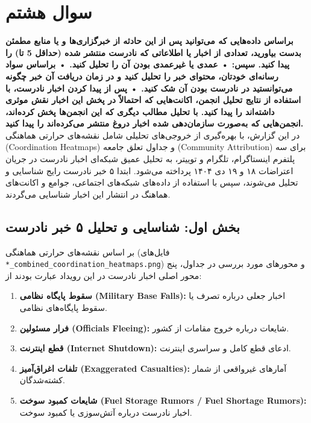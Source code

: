 \documentclass{article}
\begin{document}
\clearpage
\FloatBarrier
\section{سوال هشتم}
\textbf{براساس داده‌هایی که می‌توانید پس از این حادثه از خبرگزاری‌ها و یا منابع مطمئن بدست بیاورید، تعدادی از اخبار یا اطلاعاتی که نادرست منتشر شده (حداقل 5 تا) را پیدا کنید. سپس:
	• عمدی یا غیرعمدی بودن آن را تحلیل کنید.
	• براساس سواد رسانه‌ای خودتان، محتوای خبر را تحلیل کنید و در زمان دریافت آن خبر چگونه می‌توانستید در نادرست بودن آن شک کنید.
	• پس از پیدا کردن اخبار نادرست، با استفاده از نتایج تحلیل انجمن، اکانت‌هایی که احتمالاً در پخش این اخبار نقش موثری داشته‌اند را پیدا کنید. با تحلیل مطالب دیگری که این انجمن‌ها پخش کرده‌اند، انجمن‌هایی که به‌صورت سازمان‌دهی شده اخبار دروغ منتشر می‌کرده‌اند را پیدا کنید.}
\\

	در این گزارش، با بهره‌گیری از خروجی‌های تحلیلی شامل نقشه‌های حرارتی هماهنگی (Coordination Heatmaps) و جداول تعلق جامعه (Community Attribution) برای سه پلتفرم اینستاگرام، تلگرام و توییتر، به تحلیل عمیق شبکه‌ای اخبار نادرست در جریان اعتراضات ۱۸ و ۱۹ دی ۱۴۰۴ پرداخته می‌شود. ابتدا ۵ خبر نادرست رایج شناسایی و تحلیل می‌شوند، سپس با استفاده از داده‌های شبکه‌های اجتماعی، جوامع و اکانت‌های هماهنگ در انتشار این اخبار شناسایی می‌گردند.
	
	\subsection*{بخش اول: شناسایی و تحلیل ۵ خبر نادرست}
	
	بر اساس نقشه‌های حرارتی هماهنگی (فایل‌های \texttt{*\_combined\_coordination\_heatmaps.png}) و محورهای مورد بررسی در جداول، پنج محور اصلی اخبار نادرست در این رویداد عبارت بودند از:
	
	\begin{enumerate}
		\item \textbf{سقوط پایگاه نظامی (Military Base Falls):} اخبار جعلی درباره تصرف یا سقوط پایگاه‌های نظامی.
		\item \textbf{فرار مسئولین (Officials Fleeing):} شایعات درباره خروج مقامات از کشور.
		\item \textbf{قطع اینترنت (Internet Shutdown):} ادعای قطع کامل و سراسری اینترنت.
		\item \textbf{تلفات اغراق‌آمیز (Exaggerated Casualties):} آمارهای غیرواقعی از شمار کشته‌شدگان.
		\item \textbf{شایعات کمبود سوخت (Fuel Storage Rumors / Fuel Shortage Rumors):} اخبار نادرست درباره آتش‌سوزی یا کمبود سوخت.
	\end{enumerate}
	
\end{document}
